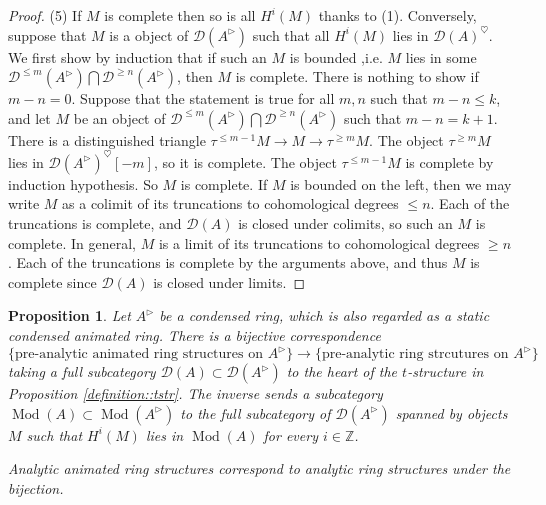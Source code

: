 \documentclass{article}
\theoremstyle{plain}
\newtheorem{prop}[thm]{Proposition}
\theoremstyle{definition}
\theoremstyle{remark}
\DeclareMathOperator{\modcat}{Mod}
\newcommand{\huflag}{\triangleright}
\newcommand{\D}{\mathcal{D}}
\newcommand{\heart}{\heartsuit}
\begin{document}
\begin{proof}
(5)
If $ M $ is complete then so is all $ H ^{i}(M) $ thanks to (1).
Conversely, suppose that $ M $ is a object of $ \D (A ^{\huflag}) $ such that all $ H ^{i}(M) $ lies in $ \D (A)^{\heart} $.
We first show by induction that
if such an $ M $ is bounded ,i.e. $ M $ lies in some $ \D ^{\leq m}(A ^{\huflag}) \bigcap \D ^{\geq n}(A ^{\huflag}) $,
then $ M $ is complete.
There is nothing to show if $ m-n=0 $. Suppose that the statement is true for all $ m,n $ such that $ m-n\leq k $,
and let $ M $ be an object of $ \D ^{\leq m}(A ^{\huflag}) \bigcap \D ^{\geq n}(A ^{\huflag}) $ such that $ m-n=k+1 $.
There is a distinguished triangle $ \tau ^{\leq m-1} M \to M \to \tau ^{\geq m} M $.
The object $ \tau ^{\geq m}M $ lies in $ \D (A ^{\huflag})^{\heart}[-m] $, so it is complete.
The object $ \tau ^{\leq m-1} M $ is complete by induction hypothesis.
So $ M $ is complete.
If $ M $ is bounded on the left, then we may write $ M $ as a colimit of its truncations to cohomological degrees $ \leq n $.
Each of the truncations is complete, and $ \D (A) $ is closed under colimits, so such an $ M $ is complete.
In general, $ M $ is a limit of its truncations to cohomological degrees $ \geq n $.
Each of the truncations is complete by the arguments above, and thus $ M $ is complete since $ \D (A) $ is closed under limits.
\end{proof}

\begin{prop}
Let $ A ^{\huflag} $ be a condensed ring, which is also regarded as a static condensed animated ring.
There is a bijective correspondence
$$ \{\text{pre-analytic animated ring structures on } A ^{\huflag}\} \to \{\text{pre-analytic ring strcutures on } A ^{\huflag}\} $$
taking a full subcategory $ \D (A)\subset \D (A ^{\huflag}) $ to the heart of the $ t $-structure in Proposition \ref{definition::tstr}.
The inverse sends a subcategory $ \modcat (A)\subset \modcat (A ^{\huflag}) $ to the full subcategory of $ \D (A ^{\huflag}) $ spanned by
objects $ M $ such that $ H ^{i}(M) $ lies in $ \modcat (A) $ for every $ i\in \mathbb{Z} $.

Analytic animated ring structures correspond to analytic ring structures under the bijection.
\label{definition::comparison}
\end{prop}
\end{document}
